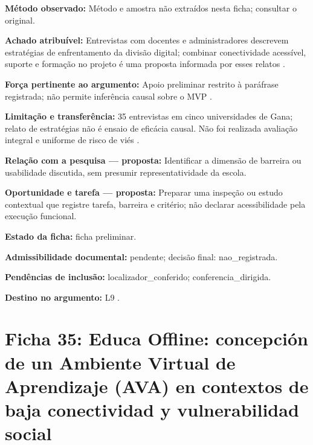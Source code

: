 \noindent\textbf{Método observado:} Método e amostra não extraídos nesta ficha; consultar o original.\par\medskip

\noindent\textbf{Achado atribuível:} Entrevistas com docentes e administradores descrevem estratégias de enfrentamento da divisão digital; combinar conectividade acessível, suporte e formação no projeto é uma proposta informada por esses relatos \citep{kumiyeboah2023}.\par\medskip

\noindent\textbf{Força pertinente ao argumento:} Apoio preliminar restrito à paráfrase registrada; não permite inferência causal sobre o MVP \citep{kumiyeboah2023}.\par\medskip

\noindent\textbf{Limitação e transferência:} 35 entrevistas em cinco universidades de Gana; relato de estratégias não é ensaio de eficácia causal. Não foi realizada avaliação integral e uniforme de risco de viés \citep{kumiyeboah2023}.\par\medskip

\noindent\textbf{Relação com a pesquisa — proposta:} Identificar a dimensão de barreira ou usabilidade discutida, sem presumir representatividade da escola.\par\medskip

\noindent\textbf{Oportunidade e tarefa — proposta:} Preparar uma inspeção ou estudo contextual que registre tarefa, barreira e critério; não declarar acessibilidade pela execução funcional.\par\medskip

\noindent\textbf{Estado da ficha:} ficha preliminar.\par\medskip

\noindent\textbf{Admissibilidade documental:} pendente; decisão final: nao\_registrada.\par\medskip

\noindent\textbf{Pendências de inclusão:} localizador\_conferido; conferencia\_dirigida.\par\medskip

\noindent\textbf{Destino no argumento:} L9 .

\clearpage\section*{Ficha 35: Educa Offline: concepción de un Ambiente Virtual de Aprendizaje (AVA) en contextos de baja conectividad y vulnerabilidad social}

